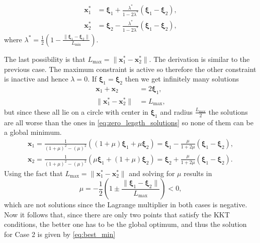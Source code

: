 \begin{equation}
\begin{aligned}
\textbf{x}_1^* &= \boldsymbol{\xi}_1 + \frac{\lambda^*}{1 - 2\lambda^*} (\boldsymbol{\xi}_1 - \boldsymbol{\xi}_2), \\
\textbf{x}_2^* &= \boldsymbol{\xi}_2 - \frac{\lambda^*}{1 - 2\lambda^*} (\boldsymbol{\xi}_1 - \boldsymbol{\xi}_2),
\label{eq:best_min}
\end{aligned}
\end{equation}
where 
$\lambda^* = \frac{1}{2} \left( 1 - \frac{\| \boldsymbol{\xi}_1 - \boldsymbol{\xi}_2 \|}{L_{\min}} \right).$
%
%

The last possibility is that $L_{\max} =  \| \textbf{x}_1^* - \textbf{x}_2^*  \|$.
%
The derivation is similar to the previous case.
The maximum constraint is active so therefore the other
constraint is inactive and hence $\lambda = 0.$
If $\boldsymbol{\xi}_1 = \boldsymbol{\xi}_2$ then we get infinitely 
many solutions
%
\begin{align}
\textbf{x}_1 + \textbf{x}_2 &= 2 \boldsymbol{\xi}_1, \\
\| \textbf{x}_1^* - \textbf{x}_2^*\| &= L_{\max},
\label{eq:zero_length_solution_max}
\end{align}
%
but since these all lie on a circle with center in $\boldsymbol{\xi}_1$ and radius
$\frac{L_{\max}}{2}$ the solutions are all worse than the ones in \eqref{eq:zero_length_solutions}
so none of them can be a global minimum.
%
\begin{equation}
\begin{aligned}
\textbf{x}_1 =  \frac{1}{(1+\mu)^2 -(\mu)^2 } \left( (1+\mu) \boldsymbol{\xi}_1 + \mu \boldsymbol{\xi}_2 \right) 
= \boldsymbol{\xi}_1 - \frac{\mu}{1+2 \mu} (\boldsymbol{\xi}_1 - \boldsymbol{\xi}_2), \\
\textbf{x}_2 =  \frac{1}{(1+\mu)^2 -(\mu)^2 } \left( \mu \boldsymbol{\xi}_1 + (1+\mu) \boldsymbol{\xi}_2 \right)
= \boldsymbol{\xi}_2 + \frac{\mu}{1+2 \mu} (\boldsymbol{\xi}_1 - \boldsymbol{\xi}_2).
\end{aligned}
\label{eq:solutions_2.3}
\end{equation}
%
Using the fact that $L_{\max} =  \| \textbf{x}_1^* - \textbf{x}_2^*  \|$ 
and solving for $\mu$ results in
%
\begin{equation}
\mu = - \frac{1}{2} \left( 1 \pm \frac{\| \boldsymbol{\xi}_1 - \boldsymbol{\xi}_2 \|}{L_{\max}} \right) < 0,
\label{eq:solutions_mu_2.3}
\end{equation}
%
which are not solutions since the Lagrange multiplier in both cases is negative.
Now it follows that, since there are only two points that satisfy the KKT
conditions, the better one has to be the global optimum, and thus the
solution for Case 2 is given by \eqref{eq:best_min}
%
%
